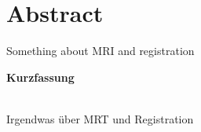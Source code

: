 \chapter*{Abstract}
Something about MRI and registration

\vspace*{1.5cm}
\begin{Huge}
\noindent \textbf{Kurzfassung}
\end{Huge}
\chapterheadstartvskip \\
Irgendwas über MRT und Registration
